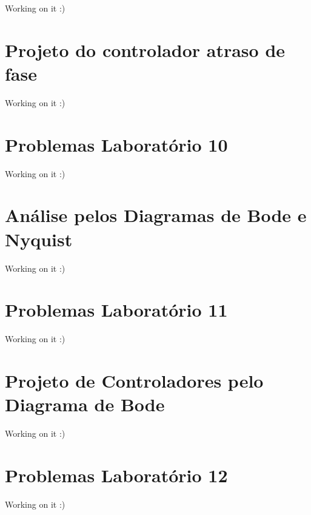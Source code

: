 \documentclass[
]{book}
\theoremstyle{definition}
\theoremstyle{definition}
\theoremstyle{definition}
\theoremstyle{remark}
\begin{document}
Working on it :)

\hypertarget{projeto-do-controlador-atraso-de-fase}{%
\chapter{Projeto do controlador atraso de fase}\label{projeto-do-controlador-atraso-de-fase}}

Working on it :)

\hypertarget{problemas-laboratuxf3rio-10}{%
\chapter*{Problemas Laboratório 10}\label{problemas-laboratuxf3rio-10}}

Working on it :)

\hypertarget{anuxe1lise-pelos-diagramas-de-bode-e-nyquist}{%
\chapter{Análise pelos Diagramas de Bode e Nyquist}\label{anuxe1lise-pelos-diagramas-de-bode-e-nyquist}}

Working on it :)

\hypertarget{problemas-laboratuxf3rio-11}{%
\chapter*{Problemas Laboratório 11}\label{problemas-laboratuxf3rio-11}}

Working on it :)

\hypertarget{projeto-de-controladores-pelo-diagrama-de-bode}{%
\chapter{Projeto de Controladores pelo Diagrama de Bode}\label{projeto-de-controladores-pelo-diagrama-de-bode}}

Working on it :)

\hypertarget{problemas-laboratuxf3rio-12}{%
\chapter*{Problemas Laboratório 12}\label{problemas-laboratuxf3rio-12}}

Working on it :)
\end{document}
